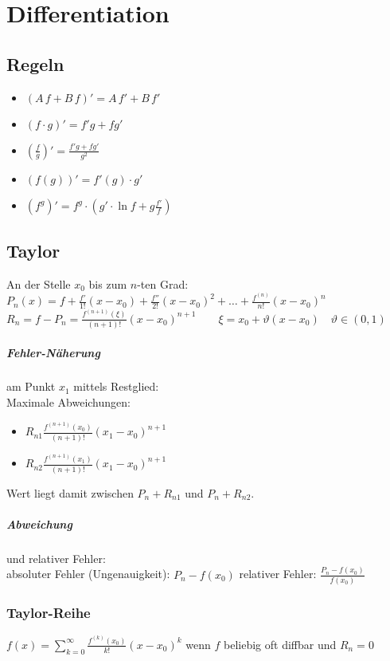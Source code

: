 \chapter{Differentiation}

\section{Regeln}
\begin{itemize}
\item $(A\,f+B\,f)' = A\,f'+B\,f'$
\item $(f\cdot g)' = f'g+fg'$
\item $\left(\frac{f}{g}\right)'=\frac{f'g+fg'}{g^2}$
\item $(f(g))'=f'(g)\cdot g'$
\item $(f^g)'=f^g\cdot \left(g'\cdot \ln f + g\frac{f'}{f}\right)$
\end{itemize}

\section{Taylor}
An der Stelle $x_0$ bis zum $n$-ten Grad:\\
$P_n(x)=f+\frac{f'}{1!}(x-x_0)+\frac{f''}{2!}(x-x_0)^2+\dots + \frac{f^{(n)}}{n!}(x-x_0)^n$\\
$R_n=f-P_n=\frac{f^{(n+1)}(\xi)}{(n+1)!}(x-x_0)^{n+1} \qquad \xi=x_0+\vartheta(x-x_0)\quad \vartheta \in (0,1)$

\paragraph{Fehler-Näherung} am Punkt $x_1$ mittels Restglied:\\
Maximale Abweichungen:
\begin{itemize}
\item $R_{n1}\frac{f^{(n+1)}(x_0)}{(n+1)!}(x_1-x_0)^{n+1}$
\item $R_{n2}\frac{f^{(n+1)}(x_1)}{(n+1)!}(x_1-x_0)^{n+1}$
\end{itemize}
Wert liegt damit zwischen $P_n+R_{n1}$ und $P_n+R_{n2}$.
\paragraph{Abweichung} und relativer Fehler:\\
absoluter Fehler (Ungenauigkeit): $P_n-f(x_0)$
relativer Fehler: $\frac{P_n-f(x_0)}{f(x_0)}$

\subsection{Taylor-Reihe}
$f(x)=\sum_{k=0}^\infty \frac{f^{(k)}(x_0)}{k!}(x-x_0)^k$ wenn $f$ beliebig oft diffbar und $R_n=0$

